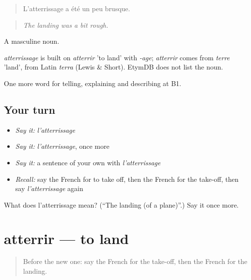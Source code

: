 \begin{quote}
L'atterrissage a été un peu brusque.
\end{quote}

\begin{quote}
\emph{The landing was a bit rough.}
\end{quote}

A masculine noun.

\begin{cousinweb}
\emph{atterrissage} is built on \emph{atterrir} 'to land' with \emph{-age}; \emph{atterrir} comes from \emph{terre} 'land', from Latin \emph{terra} (Lewis \& Short). EtymDB does not list the noun.
\end{cousinweb}

\begin{grammarlens}[title={What you've built}]
One more word for telling, explaining and describing at B1.
\end{grammarlens}

\subsection*{Your turn}
\begin{itemize}
\raggedright
  \item \emph{Say it:} \emph{l'atterrissage}
  \item \emph{Say it:} \emph{l'atterrissage}, once more
  \item \emph{Say it:} a sentence of your own with \emph{l'atterrissage}
  \item \emph{Recall:} say the French for to take off, then the French for the take-off, then say \emph{l'atterrissage} again
\end{itemize}

\begin{tcolorbox}[breakable,colback=teal!4,colframe=teal!35!black,title={Before you move on}]
What does l'atterrissage mean? (\textquotedblleft{}The landing (of a plane)\textquotedblright{}.) Say it once more.
\end{tcolorbox}
\section[atterrir]{atterrir — to land}

\label{lesson:FR-C419-atterrir}



\begin{quote}
Before the new one: say the French for the take-off, then the French for the landing.
\end{quote}

